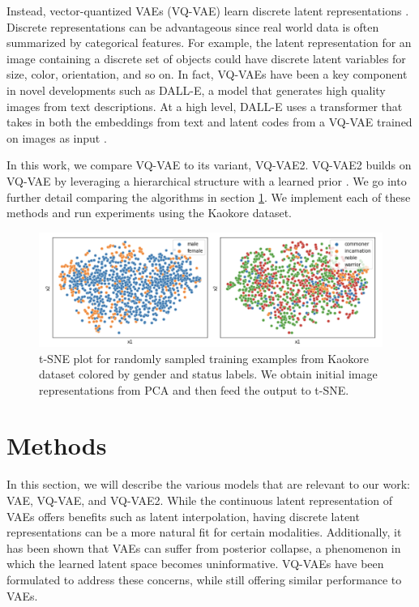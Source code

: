 \documentclass{article}
\begin{document}
Instead, vector-quantized VAEs (VQ-VAE) learn discrete latent representations \cite{VQ_VAE}. Discrete representations can be advantageous since real world data is often summarized by categorical features. For example, the latent representation for an image containing a discrete set of objects could have discrete latent variables for size, color, orientation, and so on. In fact, VQ-VAEs have been a key component in novel developments such as DALL-E, a model that generates high quality images from text descriptions. At a high level, DALL-E uses a transformer that takes in both the embeddings from text and latent codes from a VQ-VAE trained on images as input \cite{DALLE}.

In this work, we compare VQ-VAE to its variant, VQ-VAE2. VQ-VAE2 builds on VQ-VAE by leveraging a hierarchical structure with a learned prior \cite{VQ_VAE2}. We go into further detail comparing the algorithms in section \ref{methods}. We implement each of these methods and run experiments using the Kaokore dataset. 

\begin{figure}
    \centering
    \includegraphics[width=0.7\linewidth]{clustering.png}
    \caption{t-SNE plot for randomly sampled training examples from Kaokore dataset colored by gender and status labels. We obtain initial image representations from PCA and then feed the output to t-SNE.}
    \label{fig:clustering}
\end{figure} 

\section{Methods} \label{methods}

In this section, we will describe the various models that are relevant to our work: VAE, VQ-VAE, and VQ-VAE2. While the continuous latent representation of VAEs offers benefits such as latent interpolation, having discrete latent representations can be a more natural fit for certain modalities. Additionally, it has been shown that VAEs can suffer from posterior collapse, a phenomenon in which the learned latent space becomes uninformative. VQ-VAEs have been formulated to address these concerns, while still offering similar performance to VAEs. 
\end{document}

